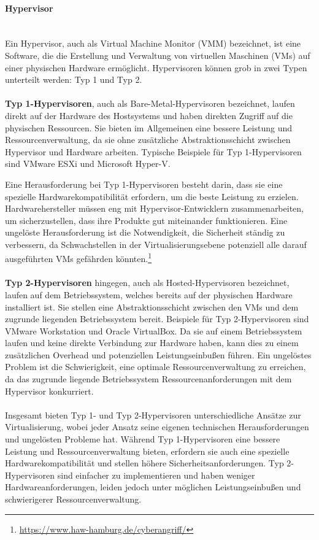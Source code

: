 \documentclass[../vs-script-first-v01.tex]{subfiles}
\begin{document}
\paragraph{Hypervisor\\\\}
Ein Hypervisor, auch als Virtual Machine Monitor (VMM) bezeichnet, ist eine Software, die die Erstellung und Verwaltung von virtuellen Maschinen (VMs) auf einer physischen Hardware ermöglicht. Hypervisoren können grob in zwei Typen unterteilt werden: Typ 1 und Typ 2.
\\\\
\textbf{Typ 1-Hypervisoren}, auch als Bare-Metal-Hypervisoren bezeichnet, laufen direkt auf der Hardware des Hostsystems und haben direkten Zugriff auf die physischen Ressourcen. Sie bieten im Allgemeinen eine bessere Leistung und Ressourcenverwaltung, da sie ohne zusätzliche Abstraktionsschicht zwischen Hypervisor und Hardware arbeiten. Typische Beispiele für Typ 1-Hypervisoren sind VMware ESXi und Microsoft Hyper-V.

Eine Herausforderung bei Typ 1-Hypervisoren besteht darin, dass sie eine spezielle Hardwarekompatibilität erfordern, um die beste Leistung zu erzielen. Hardwarehersteller müssen eng mit Hypervisor-Entwicklern zusammenarbeiten, um sicherzustellen, dass ihre Produkte gut miteinander funktionieren. Eine ungelöste Herausforderung ist die Notwendigkeit, die Sicherheit ständig zu verbessern, da Schwachstellen in der Virtualisierungsebene potenziell alle darauf ausgeführten VMs gefährden könnten.\footnote{\url{https://www.haw-hamburg.de/cyberangriff/}}
\\\\
\textbf{Typ 2-Hypervisoren} hingegen, auch als Hosted-Hypervisoren bezeichnet, laufen auf dem Betriebssystem, welches bereits auf der physischen Hardware installiert ist. Sie stellen eine Abstraktionsschicht zwischen den VMs und dem zugrunde liegenden Betriebssystem bereit. Beispiele für Typ 2-Hypervisoren sind VMware Workstation und Oracle VirtualBox.
Da sie auf einem Betriebssystem laufen und keine direkte Verbindung zur Hardware haben, kann dies zu einem zusätzlichen Overhead und potenziellen Leistungseinbußen führen. Ein ungelöstes Problem ist die Schwierigkeit, eine optimale Ressourcenverwaltung zu erreichen, da das zugrunde liegende Betriebssystem Ressourcenanforderungen mit dem Hypervisor konkurriert.
\\\\
Insgesamt bieten Typ 1- und Typ 2-Hypervisoren unterschiedliche Ansätze zur Virtualisierung, wobei jeder Ansatz seine eigenen technischen Herausforderungen und ungelösten Probleme hat. Während Typ 1-Hypervisoren eine bessere Leistung und Ressourcenverwaltung bieten, erfordern sie auch eine spezielle Hardwarekompatibilität und stellen höhere Sicherheitsanforderungen. Typ 2-Hypervisoren sind einfacher zu implementieren und haben weniger Hardwareanforderungen, leiden jedoch unter möglichen Leistungseinbußen und schwierigerer Ressourcenverwaltung.
\end{document}
